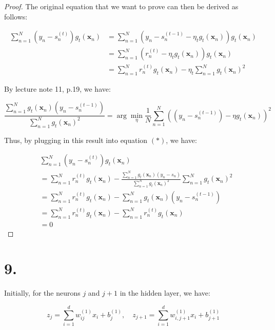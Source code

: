 \documentclass{article}
\begin{document}
\begin{proof}
The original equation that we want to prove can then be derived as follows:

\begin{align*}
    \sum_{n=1}^N (y_n -s_n^{(t)})g_t(\mathbf{x}_n) 
    &= \sum_{n=1}^N \left(y_n - s_n^{(t-1)} - \eta_t g_t(\mathbf{x}_n)\right)g_t(\mathbf{x}_n) \\
    &= \sum_{n=1}^N \left(r_n^{(t)} - \eta_t g_t(\mathbf{x}_n)\right)g_t(\mathbf{x}_n) \\
    &= \sum_{n=1}^N r_n^{(t)} g_t(\mathbf{x}_n) - \eta_t \sum_{n=1}^N g_t(\mathbf{x}_n)^2 \tag{*} 
\end{align*}

By lecture note 11, p.19, we have:

\begin{equation*}
    \frac{\sum_{n=1}^N g_t(\mathbf{x}_n)(y_n - s_n^{(t-1)})}{\sum_{n=1}^N g_t(\mathbf{x}_n)^2} 
    = \arg \min_{\eta} \frac{1}{N} \sum_{n=1}^N \left((y_n - s_n^{(t-1)}) - \eta g_t(\mathbf{x}_n)\right)^2
\end{equation*}

Thus, by plugging in this result into equation $(*)$, we have:

\begin{align*}
    &\sum_{n=1}^N (y_n -s_n^{(t)})g_t(\mathbf{x}_n) \\
    &= \sum_{n=1}^N r_n^{(t)} g_t(\mathbf{x}_n) - \frac{\sum_{n=1}^N g_t(\mathbf{x}_n)(y_n - s_n)}{\sum_{n=1}^N g_t(\mathbf{x}_n)^2} \sum_{n=1}^N g_t(\mathbf{x}_n)^2 \\ 
    &= \sum_{n=1}^N r_n^{(t)} g_t(\mathbf{x}_n) - \sum_{n=1}^N g_t(\mathbf{x}_n)(y_n - s_n^{(t-1)}) \\
    &= \sum_{n=1}^N r_n^{(t)} g_t(\mathbf{x}_n) - \sum_{n=1}^N r_n^{(t)} g_t(\mathbf{x}_n) \\
    &= 0
\end{align*}

\end{proof}

\newpage

\section*{9.}

Initially, for the neurons $j$ and $j+1$ in the hidden layer, we have:

\begin{equation*}
    z_j = \sum_{i=1}^d w_{ij}^{(1)} x_i + b_j^{(1)}, \quad z_{j+1} = \sum_{i=1}^d w_{i,j+1}^{(1)} x_i + b_{j+1}^{(1)}
\end{equation*}
\end{document}
